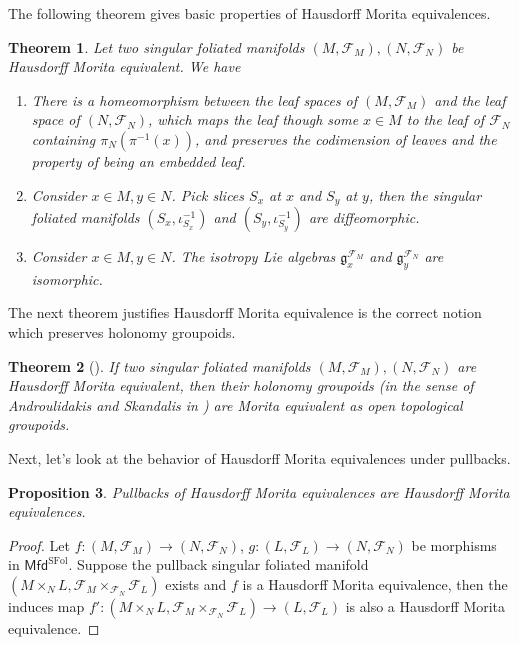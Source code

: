 \documentclass[12pt]{amsart}
\newtheorem{thm}{Theorem}[section]
\newtheorem{prop}[thm]{Proposition}
\theoremstyle{definition}
\theoremstyle{remark}
\numberwithin{equation}{section}
\newcommand{\CF}{{\mathcal F}}
\newcommand{\1}{{\mathbb{1}}}
\newcommand{\g}{\mathfrak{g}}
\newcommand{\mfd}{\mathsf{Mfd}}
\newcommand{\sfol}{{\operatorname{SFol}}}
\begin{document}
The following theorem gives basic properties of Hausdorff Morita equivalences.
\begin{thm}{\cite{GZ19}}
    Let two singular foliated manifolds $(M, \CF_M), (N, \CF_N)$ be Hausdorff Morita equivalent. We have
    \begin{enumerate}
        \item There is a homeomorphism between the leaf spaces of $(M, \CF_M)$ and the leaf space of $(N, \CF_N)$, which maps the leaf though some $x \in M$ to the leaf of $\CF_N$ containing $\pi_N(\pi^{-1}(x))$, and preserves the codimension of leaves and the property of being an embedded leaf.
        \item Consider $x\in M, y\in N$. Pick slices $S_x$ at $x$ and $S_y$ at $y$, then the singular foliated manifolds $(S_x, \iota_{S_x}^{-1})$ and $(S_y, \iota_{S_y}^{-1})$ are diffeomorphic.
        \item Consider $x\in M, y\in N$. The isotropy Lie algebras $\g_x^{\CF_M}$ and $\g_y^{\CF_N}$ are isomorphic.
    \end{enumerate} 
\end{thm}

The next theorem justifies Hausdorff Morita equivalence is the correct notion which preserves holonomy groupoids.
\begin{thm}[\cite{GZ19}]
    If two singular foliated manifolds $(M, \CF_M), (N, \CF_N)$ are Hausdorff Morita equivalent, then their holonomy groupoids (in the sense of Androulidakis and Skandalis in \cite{AS06}) are Morita equivalent as open topological groupoids.
\end{thm}


Next, let's look at the behavior of Hausdorff Morita equivalences under pullbacks.
\begin{prop}\label{he1}
    Pullbacks of Hausdorff Morita equivalences are Hausdorff Morita equivalences.
\end{prop}

\begin{proof}
 Let $f:(M, \CF_M)
    \to (N, \CF_N)$, $g: (L, \CF_L) \to (N, \CF_N)$ be morphisms in $ \mfd^{\sfol}$. Suppose the pullback singular foliated manifold $(M\times_N L,\CF_M\times_{\CF_N} \CF_L)$ exists and  $f$ is a Hausdorff Morita equivalence, then the induces map $f':(M\times_N L,\CF_M\times_{\CF_N} \CF_L) \to (L, \CF_L)$ is also a Hausdorff Morita equivalence.
\end{proof}
\end{document}
